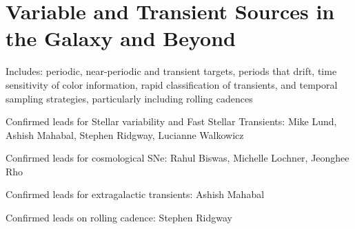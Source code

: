 
\chapter[Variables and Transients]{Variable and Transient Sources in the Galaxy and Beyond}
\label{chp:vartrans}



Includes: periodic, near-periodic and transient targets, periods that
drift, time sensitivity of color information, rapid classification of
transients, and temporal sampling strategies, particularly including
rolling cadences

Confirmed leads for Stellar variability and Fast Stellar Transients:
Mike Lund, Ashish Mahabal, Stephen Ridgway, Lucianne Walkowicz

Confirmed leads for cosmological SNe: Rahul Biswas, Michelle Lochner,
Jeonghee Rho

Confirmed leads for extragalactic transients: Ashish Mahabal

Confirmed leads on rolling cadence: Stephen Ridgway











% 


% 




